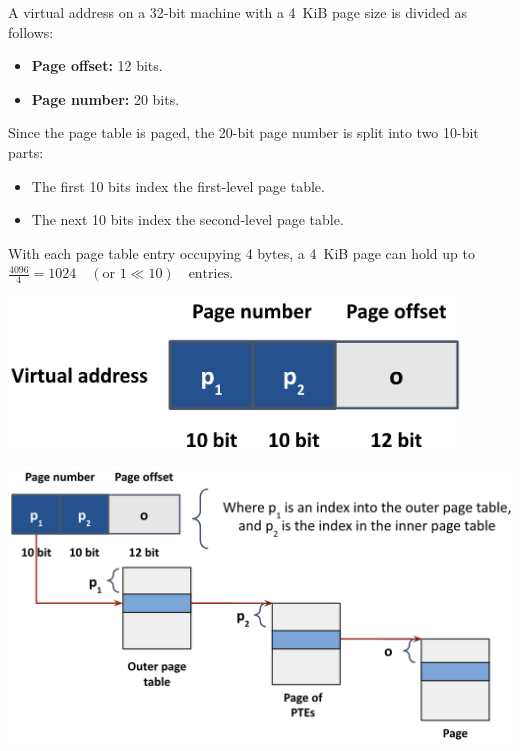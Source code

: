 \begin{example}
A virtual address on a 32-bit machine with a 4~KiB page size is divided as follows:
\begin{itemize}
  \item \textbf{Page offset:} 12 bits.
  \item \textbf{Page number:} 20 bits.
\end{itemize}
Since the page table is paged, the 20-bit page number is split into two 10-bit parts:
\begin{itemize}
  \item The first 10 bits index the first-level page table.
  \item The next 10 bits index the second-level page table.
\end{itemize}
With each page table entry occupying 4 bytes, a 4~KiB page can hold up to $\frac{4096}{4} = 1024 \quad (\text{or } 1 \ll 10) \quad \text{entries}$. \\
\noindent
\begin{minipage}{0.40\textwidth}
\begin{center}
  \includegraphics[width=0.9\textwidth]{chapters/L5/images/two-level-address.png}
\end{center}
\end{minipage}%
\hfill
\vline
\hfill
\begin{minipage}{0.50\textwidth}
\begin{center}
  \includegraphics[width=1.1\textwidth]{chapters/L5/images/two-level-diagram.png}
\end{center}
\end{minipage}
\end{example}
\normalsize
